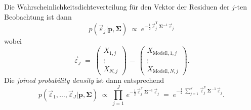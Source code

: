 Die Wahrscheinlichkeitsdichteverteilung für den Vektor der Residuen der
$j$-ten Beobachtung ist dann
\begin{equation}
p(\vec \varepsilon_j | \mathbf{p}, \boldsymbol{\Sigma}) \; \propto \; 
e^{-\frac{1}{2} \, \vec \varepsilon^\mathsf{T}_j \, \boldsymbol{\Sigma}^{-1} \, \vec \varepsilon_j }
\end{equation}
wobei
\begin{equation}
\vec \varepsilon_j \; = \; 
\left(\begin{array}{c}
X_{1,j}\\
\vdots\\
X_{N,j}
\end{array}\right) \, - \, 
\left(\begin{array}{c}
X_{\mathrm{Modell},1,j}\\
\vdots \\
X_{\mathrm{Modell},N,j}
\end{array}\right) .
\label{Residuen}
\end{equation}
Die \textsl{joined probability density} ist dann entsprechend
\begin{equation}
p(\vec \varepsilon_1,\dots, \vec \varepsilon_J | \mathbf{p}, \boldsymbol{\Sigma}) \; \propto \; 
\prod\limits_{j=1}^J \,
e^{-\frac{1}{2} \, \vec \varepsilon^\mathsf{T}_j \, \boldsymbol{\Sigma}^{-1} \, \vec \varepsilon_j } \; = \;
e^{-\frac{1}{2} \; \sum\limits_{j=1}^J \, \vec \varepsilon^\mathsf{T}_j \, \boldsymbol{\Sigma}^{-1} \, \vec \varepsilon_j } .
\label{LikelihoodKov}
\end{equation}



